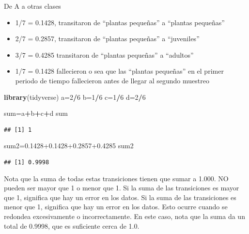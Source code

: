 \documentclass[
]{book}
\newenvironment{Shaded}{\begin{snugshade}}{\end{snugshade}}
\newcommand{\DecValTok}[1]{\textcolor[rgb]{0.00,0.00,0.81}{#1}}
\newcommand{\FloatTok}[1]{\textcolor[rgb]{0.00,0.00,0.81}{#1}}
\newcommand{\FunctionTok}[1]{\textcolor[rgb]{0.13,0.29,0.53}{\textbf{#1}}}
\newcommand{\NormalTok}[1]{#1}
\newcommand{\OtherTok}[1]{\textcolor[rgb]{0.56,0.35,0.01}{#1}}
\newcommand{\SpecialCharTok}[1]{\textcolor[rgb]{0.81,0.36,0.00}{\textbf{#1}}}
\providecommand{\tightlist}{%
  \setlength{\itemsep}{0pt}\setlength{\parskip}{0pt}}
\theoremstyle{definition}
\theoremstyle{definition}
\theoremstyle{definition}
\theoremstyle{definition}
\theoremstyle{remark}
\begin{document}
De A a otras clases

\begin{itemize}
\tightlist
\item
  1/7 = 0.1428, transitaron de ``plantas pequeñas'' a ``plantas pequeñas''
\item
  2/7 = 0.2857, transitaron de ``plantas pequeñas'' a ``juveniles''
\item
  3/7 = 0.4285 transitaron de ``plantas pequeñas'' a ``adultos''
\item
  1/7 = 0.1428 fallecieron o sea que las ``plantas pequeñas'' en el primer periodo de tiempo fallecieron antes de llegar al segundo muestreo
\end{itemize}

\begin{Shaded}
\begin{Highlighting}[]
\FunctionTok{library}\NormalTok{(tidyverse)}
\NormalTok{a}\OtherTok{=}\DecValTok{2}\SpecialCharTok{/}\DecValTok{6}
\NormalTok{b}\OtherTok{=}\DecValTok{1}\SpecialCharTok{/}\DecValTok{6}
\NormalTok{c}\OtherTok{=}\DecValTok{1}\SpecialCharTok{/}\DecValTok{6}
\NormalTok{d}\OtherTok{=}\DecValTok{2}\SpecialCharTok{/}\DecValTok{6}

\NormalTok{sum}\OtherTok{=}\NormalTok{a}\SpecialCharTok{+}\NormalTok{b}\SpecialCharTok{+}\NormalTok{c}\SpecialCharTok{+}\NormalTok{d}
\NormalTok{sum}
\end{Highlighting}
\end{Shaded}

\begin{verbatim}
## [1] 1
\end{verbatim}

\begin{Shaded}
\begin{Highlighting}[]
\NormalTok{sum2}\OtherTok{=}\FloatTok{0.1428+0.1428+0.2857+0.4285}
\NormalTok{sum2}
\end{Highlighting}
\end{Shaded}

\begin{verbatim}
## [1] 0.9998
\end{verbatim}

Nota que la suma de todas estas transiciones tienen que sumar a 1.000. NO pueden ser mayor que 1 o menor que 1. Si la suma de las transiciones es mayor que 1, significa que hay un error en los datos. Si la suma de las transiciones es menor que 1, significa que hay un error en los datos. Esto ocurre cuando se redondea excesivamente o incorrectamente. En este caso, nota que la suma da un total de 0.9998, que es suficiente cerca de 1.0.
\end{document}
